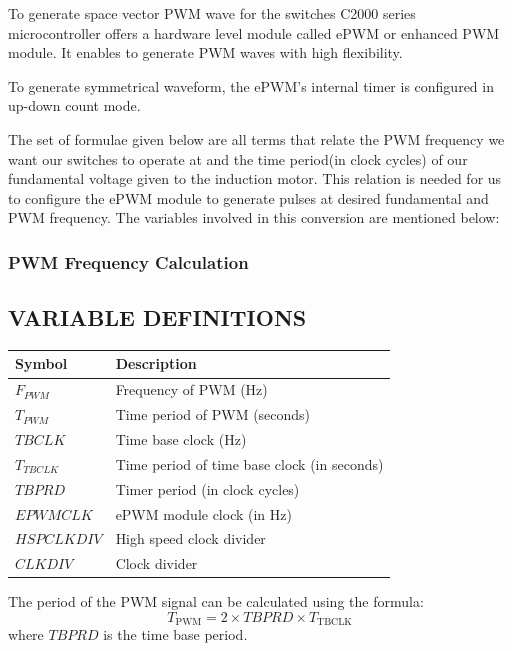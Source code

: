 To generate space vector PWM wave for the switches C2000 series microcontroller offers a hardware level module called ePWM or enhanced PWM module. It enables to generate PWM waves with high flexibility.

To generate symmetrical waveform, the ePWM's internal timer is configured in up-down count mode.


\vspace{0.2in}

The set of formulae given below are all terms that relate the PWM frequency we want our switches to operate at and the time period(in clock cycles) of our fundamental voltage given to the induction motor. This relation is needed for us to configure the ePWM module to generate pulses at desired fundamental and PWM frequency. The variables involved in this conversion are mentioned below:

\subsubsection{PWM Frequency Calculation}

\subsection*{VARIABLE DEFINITIONS}

\renewcommand{\arraystretch}{1.5}
\begin{tabular}{|>{\bfseries}l|l|}
	\hline
	Symbol      & Description                                 \\ \hline
	$F_{PWM}$   & Frequency of PWM (Hz)                       \\ \hline
	$T_{PWM}$   & Time period of PWM (seconds)                \\ \hline
	$TBCLK$     & Time base clock (Hz)                        \\ \hline
	$T_{TBCLK}$ & Time period of time base clock (in seconds) \\ \hline
	$TBPRD$     & Timer period (in clock cycles)              \\ \hline
	$EPWMCLK$   & ePWM module clock (in Hz)                   \\ \hline
	$HSPCLKDIV$ & High speed clock divider                    \\ \hline
	$CLKDIV$    & Clock divider                               \\ \hline
\end{tabular}

\vspace{0.2in}
The period of the PWM signal can be calculated using the formula:
\begin{equation}
	T_{\text{PWM}} = 2 \times TBPRD \times T_{\text{TBCLK}}
\end{equation}
where \( TBPRD \) is the time base period.

